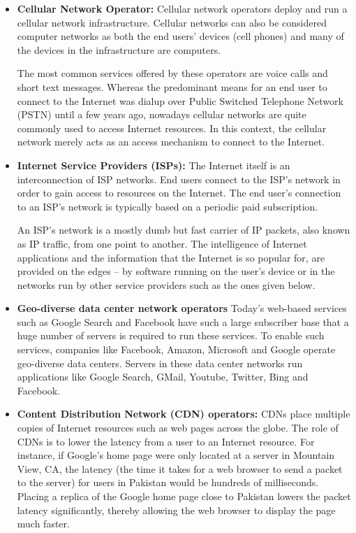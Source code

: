 \begin{itemize}
\item \textbf{Cellular Network Operator:} Cellular network operators deploy and run a cellular network infrastructure. Cellular networks can also be considered computer networks as both the end users' devices (cell phones) and many of the devices in the infrastructure are computers. 

The most common services offered by these operators are voice calls and short text messages. Whereas the predominant means for an end user to connect to the Internet was dialup over Public Switched Telephone Network (PSTN) until a few years ago, nowadays cellular networks are quite commonly used to access Internet resources. In this context, the cellular network merely acts as an access mechanism to connect to the Internet.


\item \textbf{Internet Service Providers (ISPs):} The Internet itself is an interconnection of ISP networks. End users connect to the ISP's network in order to gain access to resources on the Internet. The end user's connection to an ISP's network is typically based on a periodic paid subscription. 

An ISP's network is a mostly dumb but fast carrier of IP packets, also known as IP traffic, from one point to another. The intelligence of Internet applications and the information that the Internet is so popular for, are provided on the edges -- by software running on the user's device or in the networks run by other service providers such as the ones given below.
\item \textbf{Geo-diverse data center network operators} Today's web-based services such as Google Search and Facebook have such a large subscriber base that a huge number of servers is required to run these services. To enable such services, companies like Facebook, Amazon, Microsoft and Google operate geo-diverse data centers. Servers in these data center networks run applications like Google Search, GMail, Youtube, Twitter, Bing and Facebook.
\item \textbf{Content Distribution Network (CDN) operators:} CDNs place multiple copies of Internet resources such as web pages across the globe. The role of CDNs is to lower the latency from a user to an Internet resource. For instance, if Google's home page were only located at a server in Mountain View, CA, the latency (the time it takes for a web browser to send a packet to the server) for users in Pakistan would be hundreds of milliseconds. Placing a replica of the Google home page close to Pakistan lowers the packet latency significantly, thereby allowing the web browser to display the page much faster.
\end{itemize}


